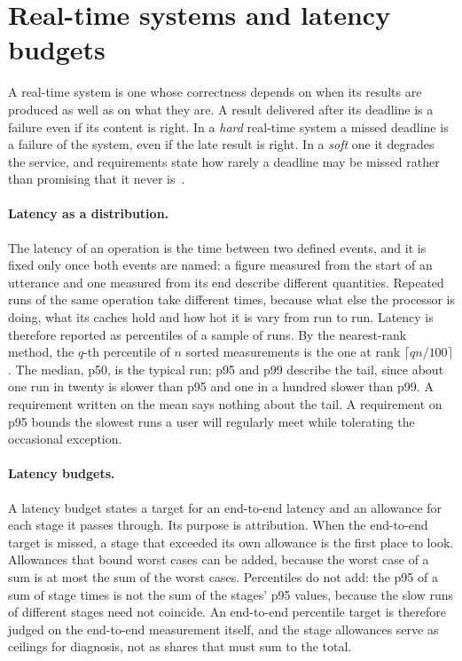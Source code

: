 \section{Real-time systems and latency budgets}
\label{sec:bg-realtime}
A real-time system is one whose correctness depends on when its results are produced as well as on
what they are. A result delivered after its deadline is a failure even if its content is right. In
a \emph{hard} real-time system a missed deadline is a failure of the system, even if the late result
is right. In a \emph{soft} one it degrades the service, and requirements state how rarely a deadline
may be missed rather than promising that it never is~\cite{buttazzo2011}.

\paragraph{Latency as a distribution.} The latency of an operation is the time between two defined
events, and it is fixed only once both events are named: a figure measured from the start of an
utterance and one measured from its end describe different quantities. Repeated runs of the same
operation take different times, because what else the processor is doing, what its caches hold and
how hot it is vary from run to run. Latency is therefore reported as percentiles of a sample of
runs. By the nearest-rank method, the $q$-th percentile of $n$ sorted measurements is the one at
rank $\lceil q n / 100 \rceil$. The median, p50, is the typical run; p95 and p99 describe the tail,
since about one run in twenty is slower than p95 and one in a hundred slower than p99. A requirement
written on the mean says nothing about the tail. A requirement on p95 bounds the slowest runs a user
will regularly meet while tolerating the occasional exception.

\paragraph{Latency budgets.} A latency budget states a target for an end-to-end latency and an
allowance for each stage it passes through. Its purpose is attribution. When the end-to-end target
is missed, a stage that exceeded its own allowance is the first place to look. Allowances that
bound worst cases can be added, because the worst case of a sum is at most the sum of the worst
cases. Percentiles do not add: the
p95 of a sum of stage times is not the sum of the stages' p95 values, because the slow runs of
different stages need not coincide. An end-to-end percentile target is therefore judged on the
end-to-end measurement itself, and the stage allowances serve as ceilings for diagnosis, not as
shares that must sum to the total.

